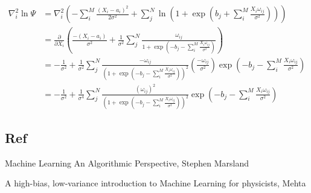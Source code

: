 \begin{align*}
\nabla_i^2 \ln \Psi &= \nabla_i^2 \left( - \sum_{i}^{M} \frac{(X_i - a_i)^2}{2 \sigma^2} +  \sum_{j}^{N} \ln \left( 1 + \exp \left( b_j + \sum_{i}^{M} \frac{X_i \omega_{ij}}{\sigma^2} \right) \right) \right) \\
&= \frac{\partial}{\partial X_i} \left( \frac{-(X_i - a_i)}{\sigma^2} + \frac{1}{\sigma^2} \sum_{j}^{N} \frac{\omega_{ij}}{1 + \exp \left( -b_j - \sum_{i}^{M} \frac{X_i \omega_{ij}}{\sigma^2} \right)} \right) \\
&= -\frac{1}{\sigma^2} + \frac{1}{\sigma^2} \sum_{j}^{N} \frac{-\omega_{ij}}{\left(1 + \exp \left( -b_j - \sum_{i}^{M} \frac{X_i \omega_{ij}}{\sigma^2} \right)\right)^2} \left( \frac{-\omega_{ij}}{\sigma^2} \right) \exp \left( -b_j - \sum_{i}^{M} \frac{X_i \omega_{ij}}{\sigma^2} \right) \\
&= -\frac{1}{\sigma^2} + \frac{1}{\sigma^4} \sum_{j}^{N} \frac{\left(\omega_{ij}\right)^2  }{\left(1 + \exp \left( -b_j - \sum_{i}^{M} \frac{X_i \omega_{ij}}{\sigma^2} \right)\right)^2}\exp \left( -b_j - \sum_{i}^{M} \frac{X_i \omega_{ij}}{\sigma^2} \right) 
\end{align*}

\subsection{Ref}
Machine Learning An Algorithmic Perspective, Stephen Marsland

A high-bias, low-variance introduction to Machine Learning for physicists, Mehta

